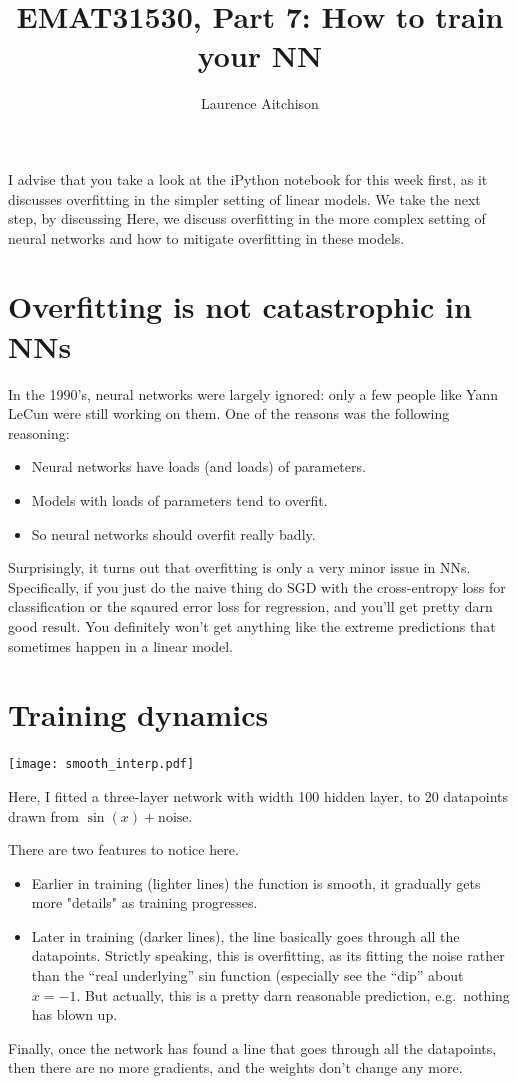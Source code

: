 \documentclass{article}
\title{EMAT31530, Part 7: How to train your NN}
\author{Laurence Aitchison}
\date{}
\newcommand{\0}{\mathbf{0}}
\begin{document}
\maketitle

I advise that you take a look at the iPython notebook for this week first, as it discusses overfitting in the simpler setting of linear models.  We take the next step, by discussing Here, we discuss overfitting in the more complex setting of neural networks and how to mitigate overfitting in these models.

\section{Overfitting is not catastrophic in NNs}

In the 1990's, neural networks were largely ignored: only a few people like Yann LeCun were still working on them.
One of the reasons was the following reasoning:
\begin{itemize}
  \item Neural networks have loads (and loads) of parameters.
  \item Models with loads of parameters tend to overfit.
  \item So neural networks should overfit really badly.
\end{itemize}
Surprisingly, it turns out that overfitting is only a very minor issue in NNs.
Specifically, if you just do the naive thing do SGD with the cross-entropy loss for classification or the sqaured error loss for regression, and you'll get pretty darn good result.
You definitely won't get anything like the extreme predictions that sometimes happen in a linear model.

\newpage
\section{Training dynamics}

\texttt{[image: smooth\_interp.pdf]}

Here, I fitted a three-layer network with width 100 hidden layer, to 20 datapoints drawn from $\sin(x) + \text{noise}$.

There are two features to notice here.
\begin{itemize}
  \item Earlier in training (lighter lines) the function is smooth, it gradually gets more "details" as training progresses.
  \item Later in training (darker lines), the line basically goes through all the datapoints. Strictly speaking, this is overfitting, as its fitting the noise rather than the ``real underlying'' sin function (especially see the ``dip'' about $x=-1$.  But actually, this is a pretty darn reasonable prediction, e.g.\ nothing has blown up.
\end{itemize}
Finally, once the network has found a line that goes through all the datapoints, then there are no more gradients, and the weights don't change any more.
\end{document}
